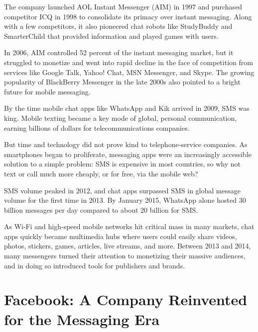 \documentclass[notoc, symmetric, nobib, nols]{towcenter-guideto-book}
\begin{document}
The company launched AOL Instant Messenger (AIM) in 1997 and purchased competitor ICQ in 1998 to consolidate its primacy over instant messaging. Along with a few competitors, it also pioneered chat robots like StudyBuddy and SmarterChild that provided information and played games with users.  

In 2006, AIM controlled 52 percent of the instant messaging market, but it struggled to monetize and went into rapid decline in the face of competition from services like Google Talk, Yahoo! Chat, MSN Messenger, and Skype. The growing popularity of BlackBerry Messenger in the late 2000s also pointed to a bright future for mobile messaging.  

By the time mobile chat apps like WhatsApp and Kik arrived in 2009, SMS was king. Mobile texting became a key mode of global, personal communication, earning billions of dollars for telecommunications companies.

But time and technology did not prove kind to telephone-service companies. As smartphones began to proliferate, messaging apps were an increasingly accessible solution to a simple problem: SMS is expensive in most countries, so why not text or call much more cheaply, or for free, via the mobile web?  

SMS volume peaked in 2012, and chat apps surpassed SMS in global message volume for the first time in 2013.\autocite{eMarketerSMS} By January 2015, WhatsApp alone hosted 30 billion messages per day compared to about 20 billion for SMS.\autocite{BenEvansWhatsApp} 

As Wi-Fi and high-speed mobile networks hit critical mass in many markets, chat apps quickly became multimedia hubs where users could easily share videos, photos, stickers, games, articles, live streams, and more. Between 2013 and 2014, many messengers turned their attention to monetizing their massive audiences, and in doing so introduced tools for publishers and brands.  

\newpage
\section[Facebook: A Company Reinvented for the Messaging Era]{Facebook: A Company Reinvented \protect\newline for the Messaging Era}
\end{document}
